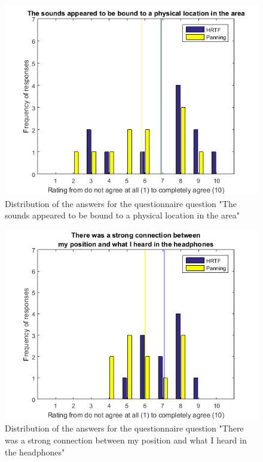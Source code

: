 \documentclass[journal]{IEEEtran}
\begin{document}
\begin{appendices}
\begin{figure}[h!]
  \centering
    \includegraphics[scale=0.7]{graphics/qq2.png}
   \caption{Distribution of the answers for the questionnaire question "The sounds appeared to be bound to a physical location in the area"}
  \label{fig:plt1}
\end{figure}

\begin{figure}[h!]
  \centering
    \includegraphics[scale=0.7]{graphics/qq3.png}
   \caption{Distribution of the answers for the questionnaire question "There was a strong connection between my position and what I heard in the headphones"}
  \label{fig:plt1}
\end{figure}


\end{appendices}
\end{document}
